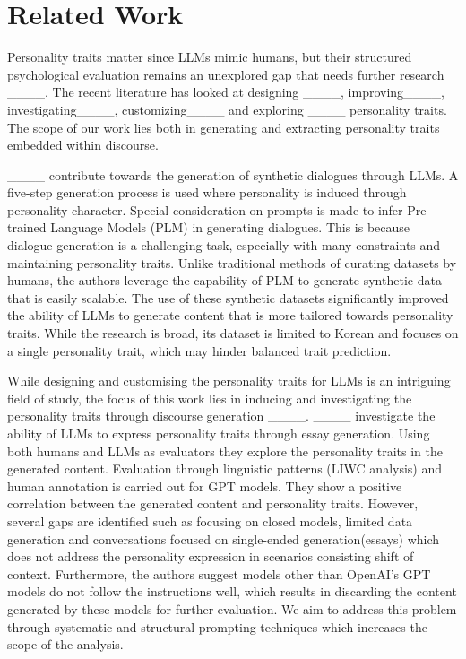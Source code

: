 \section{Related Work}
Personality traits matter since LLMs mimic humans, but their structured psychological evaluation remains an unexplored gap that needs further research ____.
The recent literature has looked at designing ____, improving____, investigating____, customizing____ and exploring ____ personality traits. The scope of our work lies both in generating and extracting personality traits embedded within discourse. 



____ contribute towards the generation of synthetic dialogues through LLMs. A five-step generation process is used where personality is induced through personality character. Special consideration on prompts is made to infer Pre-trained Language Models (PLM) in generating dialogues. This is because dialogue generation is a challenging task, especially with many constraints and maintaining personality traits. Unlike traditional methods of curating datasets by humans, the authors leverage the capability of PLM to generate synthetic data that is easily scalable. The use of these synthetic datasets significantly improved the ability of LLMs to generate content that is more tailored towards personality traits. While the research is broad, its dataset is limited to Korean and focuses on a single personality trait, which may hinder balanced trait prediction.

While designing and customising the personality traits for LLMs is an intriguing field of study, the focus of this work lies in inducing and investigating the personality traits through discourse generation ____. ____ investigate the ability of LLMs to express personality traits through essay generation. Using both humans and LLMs as evaluators they explore the personality traits in the generated content. Evaluation through linguistic patterns (LIWC analysis) and human annotation is carried out for GPT models. They show a positive correlation between the generated content and personality traits. However, several gaps are identified such as focusing on closed models, limited data generation and conversations focused on single-ended generation(essays) which does not address the personality expression in scenarios consisting shift of context. Furthermore, the authors suggest models other than OpenAI's GPT models do not follow the instructions well, which results in discarding the content generated by these models for further evaluation. We aim to address this problem through systematic and structural prompting techniques which increases the scope of the analysis. 



